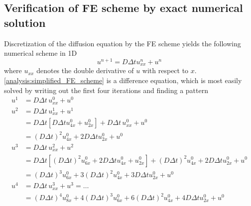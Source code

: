 \subsection{Verification of FE scheme by exact numerical solution}\label{exact_numerical_solution}

Discretization of the diffusion equation by the FE scheme yields the following numerical scheme in 1D
\begin{equation}\label{analysis:simplified_FE_scheme}
 u^{n+1} = D\Delta t u^n_{xx} + u^n
\end{equation}
where $u_{xx}$ denotes the double derivative of $u$ with respect to $x$. 
\eqref{analysis:simplified_FE_scheme} is a difference equation, which is most easily solved by writing out the first four iterations and finding a pattern
\begin{align*}
 u^1 &= D\Delta t\, u_{xx}^0 + u^0 \\
 u^2 &= D\Delta t\, u_{xx}^1 + u^1 \\
 &= D\Delta t\left[D\Delta t u_{4x}^0 + u_{2x}^0\right] + D\Delta t\, u_{xx}^0 +u^0\\
 &= \left(D\Delta t\right)^2 u_{4x}^0 + 2D\Delta t u_{2x}^0+ u^0 \\
 u^3 &= D\Delta t\, u_{xx}^2 + u^2 \\
 &= D\Delta t\left[\left(D\Delta t\right)^2 u_{6x}^0 + 2D\Delta t u_{4x}^0+ u_{2x}^0\right] + \left(D\Delta t\right)^2 u_{4x}^0 + 2D\Delta t u_{2x}^0+ u^0\\
 &= \left(D\Delta t\right)^3 u_{6x}^0 + 3\left(D\Delta t\right)^2 u_{4x}^0+ 3D\Delta tu_{2x}^0 + u^0 \\
 u^4 &= D\Delta t \,u_{xx}^3 + u^3 = \dots \\
 &= \left(D\Delta t\right)^4 u_{8x}^0 + 4\left(D\Delta t\right)^3 u_{6x}^0+ 6\left(D\Delta t\right)^2 u_{4x}^0 + 4D\Delta t u_{2x}^0 + u^0 
\end{align*}

